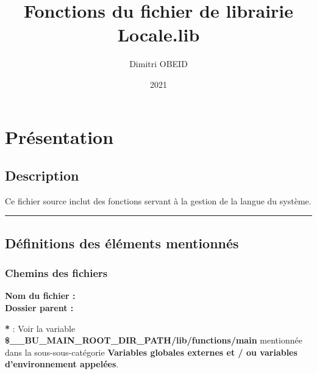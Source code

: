 \documentclass[a4paper,10pt]{article}
\title{\color{sec1}Fonctions du fichier de librairie \color{path}Locale.lib}\color{text}
\author{Dimitri OBEID}
\date{2021}
\begin{document}
    \maketitle
    \newpage

    \hypertarget{contents}{}
    \tableofcontents
    \newpage

    \color{sec1}
    \section{Présentation}\color{text}

    \color{sec2}
    \subsection{Description}\color{text}

    \begin{justify}
        Ce fichier source inclut des fonctions servant à la gestion de la langue du système.
    \end{justify}




    \color{sec2}\par\noindent\rule{\textwidth}{0.4pt}\color{text}

    \color{sec2}
    \subsection{Définitions des éléments mentionnés}\color{text}

    \color{sec3}
    \subsubsection{Chemins des fichiers}\color{text}

    \textbf{Nom du fichier : \color{path}}\\[1\baselineskip]

    \textbf{Dossier parent : \color{path}}\\[1\baselineskip]

    \begin{justify}
        \textbf{*} : Voir la variable \textbf{\color{vars}\$\_\_BU\_MAIN\_ROOT\_DIR\_PATH\color{path}/lib/functions/main} mentionnée dans la sous-sous-catégorie \textbf{\color{sec3}Variables globales externes et / ou variables d'environnement appelées}.
    \end{justify}
\end{document}
